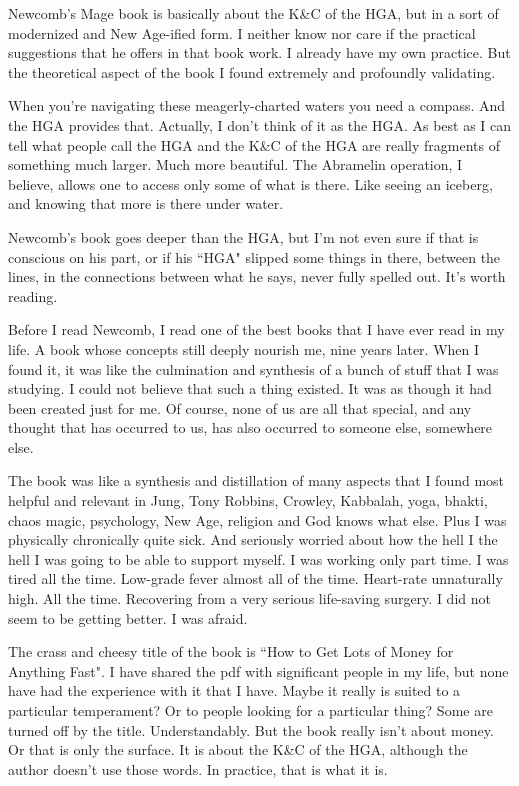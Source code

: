 \begin{footnotesize}
\begin{sffamily}
Newcomb's Mage book is basically about the K\&C of the HGA, but in a sort of modernized and New Age-ified form. I neither know nor care if the practical suggestions that he offers in that book work. I already have my own practice. But the theoretical aspect of the book I found extremely and profoundly validating.

When you're navigating these meagerly-charted waters you need a compass. And the HGA provides that. Actually, I don't think of it as the HGA. As best as I can tell what people call the HGA and the K\&C of the HGA are really fragments of something much larger. Much more beautiful. The Abramelin operation, I believe, allows one to access only some of what is there. Like seeing an iceberg, and knowing that more is there under water.

Newcomb's book goes deeper than the HGA, but I'm not even sure if that is conscious on his part, or if his ``HGA" slipped some things in there, between the lines, in the connections between what he says, never fully spelled out. It's worth reading. 

Before I read Newcomb, I read one of the best books that I have ever read in my life. A book whose concepts still deeply nourish me, nine years later. When I found it, it was like the culmination and synthesis of a bunch of stuff that I was studying. I could not believe that such a thing existed. It was as though it had been created just for me. Of course, none of us are all that special, and any thought that has occurred to us, has also occurred to someone else, somewhere else. 

The book was like a synthesis and distillation of many aspects that I found most helpful and relevant in Jung, Tony Robbins, Crowley, Kabbalah, yoga, bhakti, chaos magic, psychology, New Age, religion and God knows what else. Plus I was physically chronically quite sick. And seriously worried about how the hell I the hell I was going to be able to support myself. I was working only part time. I was tired all the time. Low-grade fever almost all of the time. Heart-rate unnaturally high. All the time. Recovering from a very serious life-saving surgery. I did not seem to be getting better. I was afraid. 

The crass and cheesy title of the book is ``How to Get Lots of Money for Anything Fast". I have shared the pdf with significant people in my life, but none have had the experience with it that I have. Maybe it really is suited to a particular temperament? Or to people looking for a particular thing? Some are turned off by the title. Understandably. But the book really isn't about money. Or that is only the surface. It is about the K\&C of the HGA, although the author doesn't use those words. In practice, that is what it is.


\end{sffamily}
\end{footnotesize}
